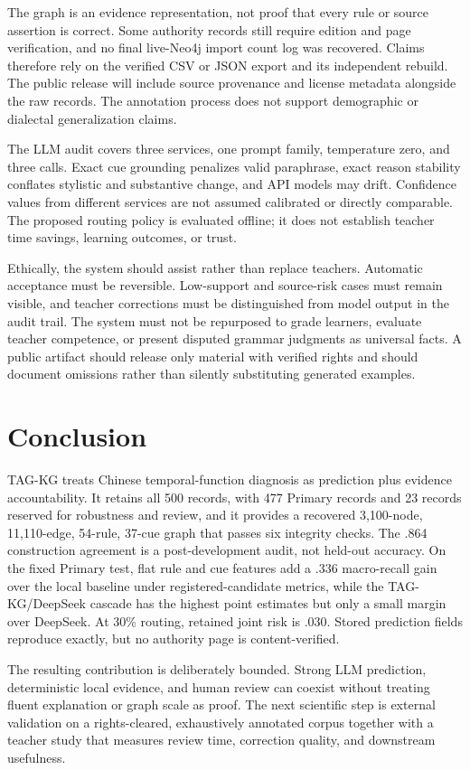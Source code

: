 \documentclass{CUP-JNL-NLP}
\begin{document}
The graph is an evidence representation, not proof that every rule or source assertion is correct. Some authority records still require edition and page verification, and no final live-Neo4j import count log was recovered. Claims therefore rely on the verified CSV or JSON export and its independent rebuild. The public release will include source provenance and license metadata alongside the raw records. The annotation process does not support demographic or dialectal generalization claims.

The LLM audit covers three services, one prompt family, temperature zero, and three calls. Exact cue grounding penalizes valid paraphrase, exact reason stability conflates stylistic and substantive change, and API models may drift. Confidence values from different services are not assumed calibrated or directly comparable. The proposed routing policy is evaluated offline; it does not establish teacher time savings, learning outcomes, or trust.

Ethically, the system should assist rather than replace teachers. Automatic acceptance must be reversible. Low-support and source-risk cases must remain visible, and teacher corrections must be distinguished from model output in the audit trail. The system must not be repurposed to grade learners, evaluate teacher competence, or present disputed grammar judgments as universal facts. A public artifact should release only material with verified rights and should document omissions rather than silently substituting generated examples.

\section{Conclusion}
TAG-KG treats Chinese temporal-function diagnosis as prediction plus evidence accountability. It retains all 500 records, with 477 Primary records and 23 records reserved for robustness and review, and it provides a recovered 3,100-node, 11,110-edge, 54-rule, 37-cue graph that passes six integrity checks. The .864 construction agreement is a post-development audit, not held-out accuracy. On the fixed Primary test, flat rule and cue features add a .336 macro-recall gain over the local baseline under registered-candidate metrics, while the TAG-KG/DeepSeek cascade has the highest point estimates but only a small margin over DeepSeek. At 30\% routing, retained joint risk is .030. Stored prediction fields reproduce exactly, but no authority page is content-verified.

The resulting contribution is deliberately bounded. Strong LLM prediction, deterministic local evidence, and human review can coexist without treating fluent explanation or graph scale as proof. The next scientific step is external validation on a rights-cleared, exhaustively annotated corpus together with a teacher study that measures review time, correction quality, and downstream usefulness.
\end{document}
